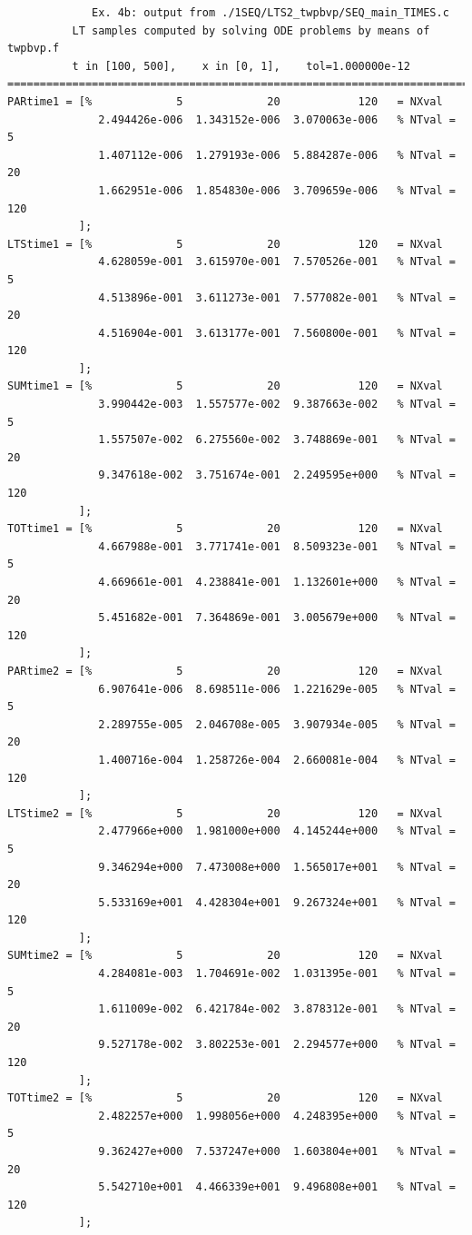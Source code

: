 \documentclass[a4paper,10pt]{report}%
\begin{document}
\begin{lstlisting}
             Ex. 4b: output from ./1SEQ/LTS2_twpbvp/SEQ_main_TIMES.c
          LT samples computed by solving ODE problems by means of twpbvp.f
          t in [100, 500],    x in [0, 1],    tol=1.000000e-12
====================================================================================
PARtime1 = [%             5             20            120   = NXval
              2.494426e-006  1.343152e-006  3.070063e-006   % NTval =   5
              1.407112e-006  1.279193e-006  5.884287e-006   % NTval =  20
              1.662951e-006  1.854830e-006  3.709659e-006   % NTval = 120
           ];
LTStime1 = [%             5             20            120   = NXval
              4.628059e-001  3.615970e-001  7.570526e-001   % NTval =   5
              4.513896e-001  3.611273e-001  7.577082e-001   % NTval =  20
              4.516904e-001  3.613177e-001  7.560800e-001   % NTval = 120
           ];
SUMtime1 = [%             5             20            120   = NXval
              3.990442e-003  1.557577e-002  9.387663e-002   % NTval =   5
              1.557507e-002  6.275560e-002  3.748869e-001   % NTval =  20
              9.347618e-002  3.751674e-001  2.249595e+000   % NTval = 120
           ];
TOTtime1 = [%             5             20            120   = NXval
              4.667988e-001  3.771741e-001  8.509323e-001   % NTval =   5
              4.669661e-001  4.238841e-001  1.132601e+000   % NTval =  20
              5.451682e-001  7.364869e-001  3.005679e+000   % NTval = 120
           ];
PARtime2 = [%             5             20            120   = NXval
              6.907641e-006  8.698511e-006  1.221629e-005   % NTval =   5
              2.289755e-005  2.046708e-005  3.907934e-005   % NTval =  20
              1.400716e-004  1.258726e-004  2.660081e-004   % NTval = 120
           ];
LTStime2 = [%             5             20            120   = NXval
              2.477966e+000  1.981000e+000  4.145244e+000   % NTval =   5
              9.346294e+000  7.473008e+000  1.565017e+001   % NTval =  20
              5.533169e+001  4.428304e+001  9.267324e+001   % NTval = 120
           ];
SUMtime2 = [%             5             20            120   = NXval
              4.284081e-003  1.704691e-002  1.031395e-001   % NTval =   5
              1.611009e-002  6.421784e-002  3.878312e-001   % NTval =  20
              9.527178e-002  3.802253e-001  2.294577e+000   % NTval = 120
           ];
TOTtime2 = [%             5             20            120   = NXval
              2.482257e+000  1.998056e+000  4.248395e+000   % NTval =   5
              9.362427e+000  7.537247e+000  1.603804e+001   % NTval =  20
              5.542710e+001  4.466339e+001  9.496808e+001   % NTval = 120
           ];
\end{lstlisting}
\end{document}
